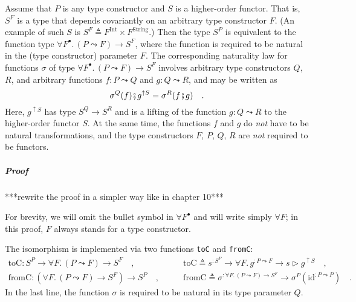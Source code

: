 Assume that $P$ is any type constructor and $S$ is a higher-order
functor.
That is, $S^{F}$ is a type that depends covariantly on an arbitrary
type constructor $F$. (An example of such $S$ is $S^{F}\triangleq F^{\text{Int}}\times F^{\text{String}}$.)
Then the type $S^{P}$ is equivalent to the function type $\forall F^{\bullet}.\,(P\leadsto F)\rightarrow S^{F}$,
where the function is required to be natural in the (type constructor)
parameter $F$. The corresponding naturality law for functions $\sigma$
of type $\forall F^{\bullet}.\,(P\leadsto F)\rightarrow S^{F}$ involves
arbitrary type constructors $Q$, $R$, and arbitrary functions $f:P\leadsto Q$
and $g:Q\leadsto R$, and may be written as
\begin{equation}
\sigma^{Q}(f)\bef g^{\uparrow S}=\sigma^{R}(f\bef g)\quad.\label{eq:assumed-naturality-of-argument-sigma}
\end{equation}
Here, $g^{\uparrow S}$ has type $S^{Q}\rightarrow S^{R}$ and is
a lifting of the function $g:Q\leadsto R$ to the higher-order functor
$S$. At the same time, the functions $f$ and $g$ do \emph{not}
have to be natural transformations, and the type constructors $F$,
$P$, $Q$, $R$ are \emph{not} required to be functors.

\subparagraph{Proof}

{*}{*}{*}rewrite the proof in a simpler way like in chapter 10{*}{*}{*} 

For brevity, we will omit the bullet symbol in $\forall F^{\bullet}$
and will write simply $\forall F$; in this proof, $F$ always stands
for a type constructor.

The isomorphism is implemented via two functions \lstinline!toC!
and \lstinline!fromC!:
\begin{align*}
\text{toC}:S^{P}\rightarrow\forall F.\,(P\leadsto F)\rightarrow S^{F}\quad, & \quad\quad\text{toC}\triangleq s^{:S^{P}}\rightarrow\forall F.\,g^{:P\leadsto F}\rightarrow s\triangleright g^{\uparrow S}\quad,\\
\text{fromC}:(\forall F.\,(P\leadsto F)\rightarrow S^{F})\rightarrow S^{P}\quad, & \quad\quad\text{fromC}\triangleq\sigma^{:\forall F.\,(P\leadsto F)\rightarrow S^{F}}\rightarrow\sigma^{P}(\text{id}^{:P\leadsto P})\quad.
\end{align*}
In the last line, the function $\sigma$ is required to be natural
in its type parameter $Q$.

